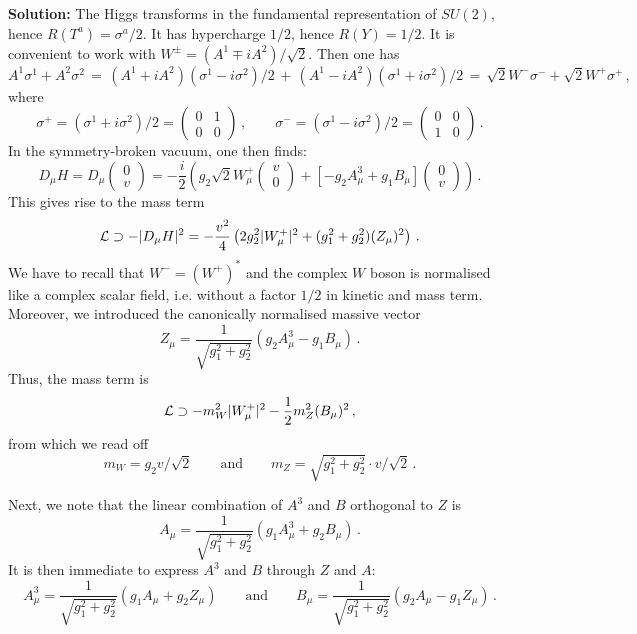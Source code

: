 \documentclass[12pt]{article}
\newcommand{\be}{\begin{equation}}
\newcommand{\ee}{\end{equation}}
\numberwithin{equation}{section}
\begin{document}
\noindent
{\bf Solution:} The Higgs transforms in the fundamental representation of $SU(2)$, hence $R(T^a)=\sigma^a/2$. It has hypercharge $1/2$, hence $R(Y)=1/2$. 
It is convenient to work with $W^\pm=(A^1\mp iA^2)/\sqrt{2}$. Then one has
\be
A^1\sigma^1+A^2\sigma^2\,=\,
(A^1+iA^2)(\sigma^1-i\sigma^2)/2\,+\,(A^1-iA^2)(\sigma^1+i\sigma^2)/2
\,=\,\sqrt{2}W^-\sigma^- + \sqrt{2}W^+\sigma^+\,,
\ee
where
\be
\sigma^+=(\sigma^1+i\sigma^2)/2=\left(\begin{array}{cc}0&1\\0&0\end{array}
\right)\,,
\qquad
\sigma^-=(\sigma^1-i\sigma^2)/2=\left(\begin{array}{cc}0&0\\1&0\end{array}
\right)\,.
\ee
In the symmetry-broken vacuum, one then finds:
\be
D_\mu H=D_\mu\left(\begin{array}{c} 0 \\ v \end{array}\right)
=-
\frac{i}{2}\left(g_2\sqrt{2}W^+_\mu\left(\begin{array}{c} v \\ 0 \end{array}\right)
+\left[
-g_2A^3_\mu+g_1B_\mu
\right] \left(\begin{array}{c} 0 \\ v \end{array}\right)
\right)\,.
\ee
This gives rise to the mass term
\be
{\cal L}\supset -|D_\mu H|^2 = -\frac{v^2}{4}\left(2g_2^2|W^+_\mu|^2 + (g_1^2+g_2^2)(Z_\mu)^2 \right)\,.
\ee
We have to recall that $W^-=(W^+)^*$ and the complex $W$ boson is normalised like a complex scalar field, i.e. without a factor $1/2$ in kinetic and mass term. Moreover, we introduced the canonically normalised massive vector
\be
Z_\mu=\frac{1}{\sqrt{g_1^2+g_2^2}}(g_2A^3_\mu-g_1 B_\mu)\,.
\ee
Thus, the mass term is
\be
{\cal L}\supset -m_W^2|W^+_\mu|^2-\frac{1}{2}m_Z^2(B_\mu)^2\,,
\ee
from which we read off
\be
m_W=g_2v/\sqrt{2}\qquad\mbox{and}\qquad m_Z=\sqrt{g_1^2+g_2^2}\cdot v/\sqrt{2}\,.
\ee

Next, we note that the linear combination of $A^3$ and $B$ orthogonal to $Z$ is
\be
A_\mu=\frac{1}{\sqrt{g_1^2+g_2^2}}(g_1A^3_\mu+g_2B_\mu)\,.
\ee
It is then immediate to express $A^3$ and $B$ through $Z$ and $A$:
\be
A^3_\mu=\frac{1}{\sqrt{g_1^2+g_2^2}}(g_1A_\mu+g_2Z_\mu)
\qquad \mbox{and}\qquad
B_\mu=\frac{1}{\sqrt{g_1^2+g_2^2}}(g_2A_\mu-g_1Z_\mu)\,.
\ee
\end{document}
